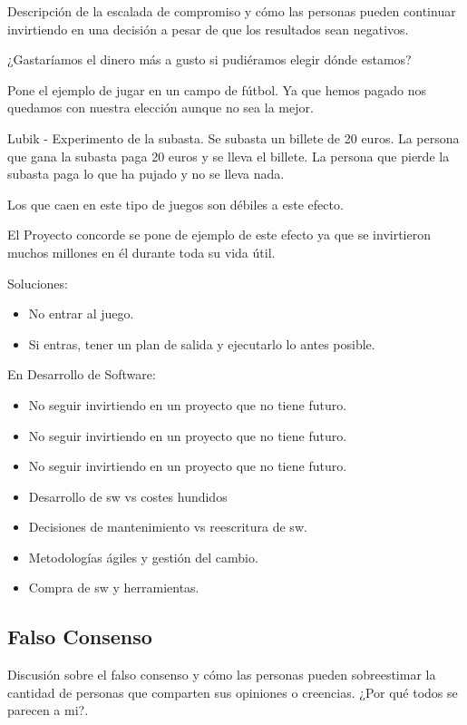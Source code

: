 \documentclass[12pt, a4paper, twoside]{article}
\begin{document}
Descripción de la escalada de compromiso y cómo las personas pueden continuar invirtiendo en una decisión a pesar de que los resultados sean negativos.

¿Gastaríamos el dinero más a gusto si pudiéramos elegir dónde estamos?

Pone el ejemplo de jugar en un campo de fútbol. Ya que hemos pagado nos quedamos con nuestra elección
aunque no sea la mejor.

Lubik - Experimento de la subasta. Se subasta un billete de 20 euros. La persona que gana la subasta
paga 20 euros y se lleva el billete. La persona que pierde la subasta paga lo que ha pujado y no se lleva nada.

Los que caen en este tipo de juegos son débiles a este efecto.

El Proyecto concorde se pone de ejemplo de este efecto ya que se invirtieron muchos millones en él durante
toda su vida útil.  


Soluciones:

\begin{itemize}
    \item No entrar al juego.
    \item Si entras, tener un plan de salida y ejecutarlo lo antes posible.

\end{itemize}

\newpage
En Desarrollo de Software:
\begin{itemize}
    \item No seguir invirtiendo en un proyecto que no tiene futuro.
    \item No seguir invirtiendo en un proyecto que no tiene futuro.
    \item No seguir invirtiendo en un proyecto que no tiene futuro.
    \item Desarrollo de sw vs costes hundidos
    \item Decisiones de mantenimiento vs reescritura de sw.
    \item Metodologías ágiles y gestión del cambio.
    \item Compra de sw y herramientas.
\end{itemize}


\subsection{Falso Consenso}

Discusión sobre el falso consenso y cómo las personas pueden sobreestimar la cantidad de personas que comparten sus opiniones o creencias.
¿Por qué todos se parecen a mi?.
\end{document}
